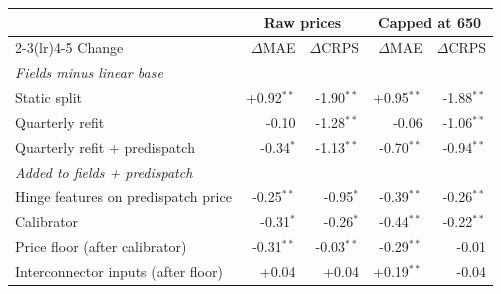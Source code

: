 \begin{tabular}{lrrrr}
\toprule
& \multicolumn{2}{c}{Raw prices} & \multicolumn{2}{c}{Capped at 650} \\
\cmidrule(lr){2-3}\cmidrule(lr){4-5}
Change & $\Delta$MAE & $\Delta$CRPS & $\Delta$MAE & $\Delta$CRPS \\
\midrule
\multicolumn{5}{l}{\emph{Fields minus linear base}} \\
\quad Static split & +0.92$^{**}$ & -1.90$^{**}$ & +0.95$^{**}$ & -1.88$^{**}$ \\
\quad Quarterly refit & -0.10 & -1.28$^{**}$ & -0.06 & -1.06$^{**}$ \\
\quad Quarterly refit + predispatch & -0.34$^{*}$ & -1.13$^{**}$ & -0.70$^{**}$ & -0.94$^{**}$ \\
\multicolumn{5}{l}{\emph{Added to fields + predispatch}} \\
\quad Hinge features on predispatch price & -0.25$^{**}$ & -0.95$^{*}$ & -0.39$^{**}$ & -0.26$^{**}$ \\
\quad Calibrator & -0.31$^{*}$ & -0.26$^{*}$ & -0.44$^{**}$ & -0.22$^{**}$ \\
\quad Price floor (after calibrator) & -0.31$^{**}$ & -0.03$^{**}$ & -0.29$^{**}$ & -0.01 \\
\quad Interconnector inputs (after floor) & +0.04 & +0.04 & +0.19$^{**}$ & -0.04 \\
\bottomrule
\end{tabular}
